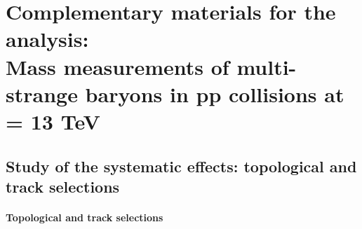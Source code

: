 \chapter{Complementary materials for the analysis:\\Mass measurements of multi-strange baryons in pp collisions at \sqrtS = 13 TeV}
\label{appendix:CPTAnalysis}

\newpage

\section{Study of the systematic effects: topological and track selections}

\subsubsection{Topological and track selections}

